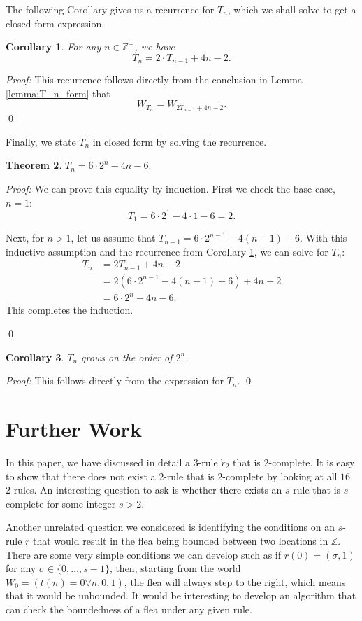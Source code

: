 \documentclass[12pt]{amsart}
\newtheorem{theorem}{Theorem}[section]
\newtheorem{corollary}[theorem]{Corollary}
\newcommand{\rtwo}{\mathring{r}_2}
\newcommand{\z}{\mathbb{Z}}
\newcommand{\zp}{\mathbb{Z}^+}
\begin{document}
The following Corollary gives us a recurrence for $T_n$, which we shall solve to get a closed form expression.

\begin{corollary}
For any $n \in \zp$, we have
$$T_{n} = 2 \cdot T_{n-1} + 4n - 2.$$
\label{cor:T_n_recurrence}
\end{corollary}

\textit{Proof:} This recurrence follows directly from the conclusion in Lemma \ref{lemma:T_n_form} that
$$W_{T_n} = W_{2T_{n-1} + 4n - 2}.$$
\qed

Finally, we state $T_n$ in closed form by solving the recurrence.

\begin{theorem}
$T_n = 6 \cdot 2^n - 4n - 6.$
\end{theorem}

\textit{Proof:} 
We can prove this equality by induction.
First we check the base case, $n=1$:
$$T_1=6 \cdot 2^1 - 4 \cdot 1 - 6 = 2.$$

Next, for $n > 1$, let us assume that $T_{n-1}=6 \cdot 2^{n-1} - 4(n-1) - 6$. With this inductive assumption and the recurrence from Corollary \ref{cor:T_n_recurrence}, we can solve for $T_n$:
\begin{align*}
  T_n &  = 2T_{n-1} + 4n - 2 \\
  & = 2(6 \cdot 2^{n-1} - 4(n-1) - 6) + 4n - 2 \\
  & =  6 \cdot 2^n - 4n - 6.
\end{align*}
This completes the induction.

\qed

\begin{corollary}
$T_n$ grows on the order of $2^n$.
\end{corollary}

\textit{Proof:} This follows directly from the expression for $T_n$.
\qed

\section{Further Work\label{sec:furtherwork}}

In this paper, we have discussed in detail a $3$-rule $\rtwo$ that is $2$-complete. It is easy to show that there does not exist a $2$-rule that is $2$-complete by looking at all $16$ $2$-rules. An interesting question to ask is whether there exists an $s$-rule that is $s$-complete for some integer $s > 2$.

Another unrelated question we considered is identifying the conditions on an $s$-rule $r$ that would result in the flea being bounded between two locations in $\z$. There are some very simple conditions we can develop such as if $r(0)=(\sigma, 1)$ for any $\sigma \in \{0,\dots,s-1\}$, then, starting from the world $W_0 = (t(n)=0 \forall n, 0, 1)$, the flea will always step to the right, which means that it would be unbounded. It would be interesting to develop an algorithm that can check the boundedness of a flea under any given rule.
\end{document}
